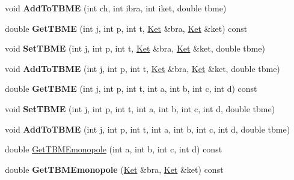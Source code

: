 \begin{DoxyCompactItemize}
\item 
\hypertarget{classOperator_a13bccafc49a4ec4ddb36500abf6a721d}{void {\bfseries Add\-To\-T\-B\-M\-E} (int ch, int ibra, int iket, double tbme)}\label{classOperator_a13bccafc49a4ec4ddb36500abf6a721d}

\item 
\hypertarget{classOperator_a79f6a8357aba1a53488a211428f5b046}{double {\bfseries Get\-T\-B\-M\-E} (int j, int p, int t, \hyperlink{classKet}{Ket} \&bra, \hyperlink{classKet}{Ket} \&ket) const }\label{classOperator_a79f6a8357aba1a53488a211428f5b046}

\item 
\hypertarget{classOperator_a3528a3b611a37079fbe2df1d45e7dae0}{void {\bfseries Set\-T\-B\-M\-E} (int j, int p, int t, \hyperlink{classKet}{Ket} \&bra, \hyperlink{classKet}{Ket} \&ket, double tbme)}\label{classOperator_a3528a3b611a37079fbe2df1d45e7dae0}

\item 
\hypertarget{classOperator_a128ef2a259a9013e78a7de578690bb79}{void {\bfseries Add\-To\-T\-B\-M\-E} (int j, int p, int t, \hyperlink{classKet}{Ket} \&bra, \hyperlink{classKet}{Ket} \&ket, double tbme)}\label{classOperator_a128ef2a259a9013e78a7de578690bb79}

\item 
\hypertarget{classOperator_a9a02bbea22b1e9c3c6e2ec23ca49843a}{double {\bfseries Get\-T\-B\-M\-E} (int j, int p, int t, int a, int b, int c, int d) const }\label{classOperator_a9a02bbea22b1e9c3c6e2ec23ca49843a}

\item 
\hypertarget{classOperator_a181122181f05852394df34551dbee77a}{void {\bfseries Set\-T\-B\-M\-E} (int j, int p, int t, int a, int b, int c, int d, double tbme)}\label{classOperator_a181122181f05852394df34551dbee77a}

\item 
\hypertarget{classOperator_a14cf7e310dcf259009e5f89ea9bbcd50}{void {\bfseries Add\-To\-T\-B\-M\-E} (int j, int p, int t, int a, int b, int c, int d, double tbme)}\label{classOperator_a14cf7e310dcf259009e5f89ea9bbcd50}

\item 
double \hyperlink{classOperator_aa08e81b63a14ef552ab8bd645196cfdb}{Get\-T\-B\-M\-Emonopole} (int a, int b, int c, int d) const 
\item 
\hypertarget{classOperator_ab4fc7ebb40894955f10d349b1c59c8a8}{double {\bfseries Get\-T\-B\-M\-Emonopole} (\hyperlink{classKet}{Ket} \&bra, \hyperlink{classKet}{Ket} \&ket) const }\label{classOperator_ab4fc7ebb40894955f10d349b1c59c8a8}


\end{DoxyCompactItemize}
